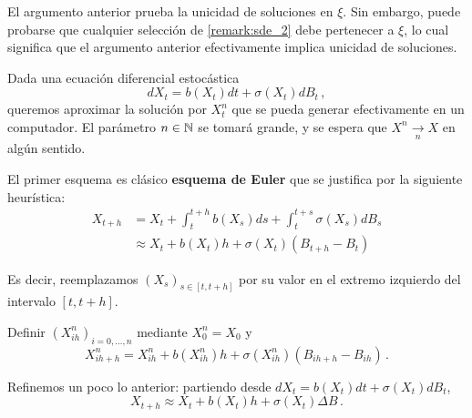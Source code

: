 \begin{remark}
    El argumento anterior prueba la unicidad de soluciones en $\xi$. Sin embargo, puede probarse que cualquier selección de \ref{remark:sde_2} debe pertenecer a $\xi$, lo cual significa que el argumento anterior efectivamente implica unicidad de soluciones. 
\end{remark}

Dada una ecuación diferencial estocástica 
\begin{equation*}
    dX_t = b(X_t)dt + \sigma(X_t) dB_t\,,
\end{equation*}
queremos aproximar la solución por $X_t^{n}$ que se pueda generar efectivamente en un computador. 
\newp El parámetro $n \in \mathbb{N}$ se tomará grande, y se espera que $X^{n} \xrightarrow[n]{} X$ en algún sentido. 

El primer esquema es clásico \textbf{esquema de Euler} que se justifica por la siguiente heurística: 
\begin{align*}
    \label{eq:sde_3}
    X_{t+h} &= X_t + \int_{t}^{t+h} b(X_s) ds + \int_{t}^{t+s} \sigma(X_s) dB_s \\
            &\approx X_t + b(X_t) h + \sigma(X_t) (B_{t+h} - B_{t})
\end{align*}

Es decir, reemplazamos $(X_s)_{s \in [t,t+h]}$ por su valor en el extremo izquierdo del intervalo $[t,t+h]$.

\begin{algorithm}
\begin{leftbar}
{}
Definir $(X^{n}_{ih})_{i = 0, \ldots, n}$ mediante $X_{0}^{n} = X_0$ y
    \begin{equation*}
            X^{n}_{ih + h} = X^{n}_{ih} + b(X^{n}_{ih})h + \sigma(X^{n}_{ih})(B_{ih + h} - B_{ih})\,.
    \end{equation*}
\end{leftbar}
\end{algorithm}
Refinemos un poco lo anterior: partiendo desde $dX_t = b(X_t) dt + \sigma (X_t) dB_t$,
\begin{equation*}
        X_{t+h} \approx X_t + b(X_t) h + \sigma(X_t) \Delta B\,.
\end{equation*}

